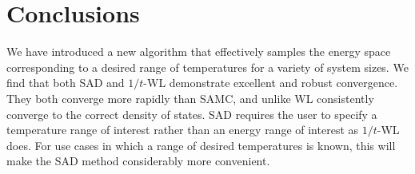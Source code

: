 \documentclass[letterpaper,twocolumn,amsmath,amssymb,pre,aps,10pt]{revtex4-1}
\begin{document}




\section{Conclusions}
We have introduced a new algorithm that effectively samples the
energy space corresponding to a desired range of temperatures for a
variety of system sizes. 
%
We find that both SAD and $1/t$-WL demonstrate excellent and robust
convergence.
They both converge more rapidly than SAMC, and unlike WL consistently
converge to the correct density of states. SAD requires
the user to specify a temperature range of interest rather than an
energy range of interest as $1/t$-WL does.  For use cases in which
a range of desired temperatures is known, this will make the SAD method
considerably more convenient.
\end{document}
